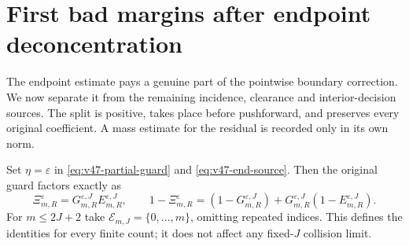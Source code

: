 \section{First bad margins after endpoint deconcentration}
\label{sec:v47-first-bad-margins}
The endpoint estimate pays a genuine part of the pointwise boundary
correction. We now separate it from the remaining incidence, clearance
and interior-decision sources. The split is positive, takes place
before pushforward, and preserves every original coefficient. A mass
estimate for the residual is recorded only in its own norm.

Set $\eta=\varepsilon$ in
\eqref{eq:v47-partial-guard} and \eqref{eq:v47-end-source}. Then the
original guard factors exactly as
\begin{equation}\label{eq:v47-guard-factorization}
 \Xi_{m,R}^{\varepsilon}
       =G_{m,R}^{\varepsilon,J}E_{m,R}^{\varepsilon,J},\qquad
 1-\Xi_{m,R}^{\varepsilon}
       =(1-G_{m,R}^{\varepsilon,J})
          +G_{m,R}^{\varepsilon,J}(1-E_{m,R}^{\varepsilon,J}).
\end{equation}
For $m\le2J+2$ take $\mathcal E_{m,J}=\{0,\ldots,m\}$, omitting
repeated indices. This defines the identities for every finite count;
it does not affect any fixed-$J$ collision limit.

